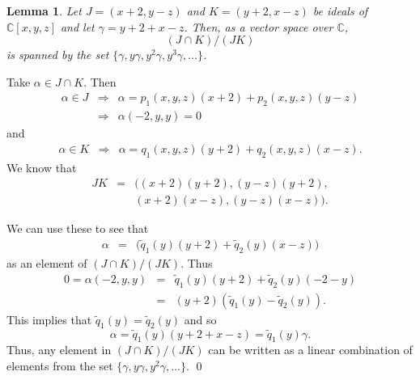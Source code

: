 \documentclass{slides}
\newcommand{\bbc}{\mathbb{C}}
\newtheorem{lemma}{Lemma}
\begin{document}
\begin{slide}
\begin{lemma}
Let $J = (x+2, y-z)$ and $K = (y+2, x-z)$ be ideals of
$\bbc[x,y,z]$ and let $\gamma = y + 2 + x - z$.
Then, as a vector space over $\bbc$,
$$(J \cap K)/(JK)$$ is spanned by the set
$\{ \gamma, y \gamma, y^2 \gamma, y^3 \gamma, \dots \}$.
\label{lem-y-gamma}
\end{lemma}

\proof
Take $\alpha \in J \cap K$.  Then
\begin{eqnarray}
\alpha \in J & \Rightarrow & \alpha = p_1(x,y,z) (x+2) + p_2(x,y,z) (y-z) \nonumber \\
& \Rightarrow & \alpha(-2,y,y) = 0 \nonumber
\end{eqnarray}
and
\begin{eqnarray}
\alpha \in K & \Rightarrow & \alpha = q_1(x,y,z) (y+2) + q_2(x,y,z) (x-z). \nonumber
\end{eqnarray}
We know that
\begin{eqnarray}
JK & = & \Big( (x+2)(y+2), (y-z)(y+2), \nonumber \\
& & (x+2)(x-z), (y-z)(x-z) \Big). \nonumber
\end{eqnarray}
\end{slide}

\begin{slide}
We can use these to see that
\begin{eqnarray}
\alpha &  = & \Big( \tilde{q}_1(y) (y+2) + \tilde{q}_2(y) (x-z) \Big)\nonumber
\end{eqnarray}
as an element of $(J \cap K) / (JK)$.
Thus
\begin{eqnarray}
0 = \alpha(-2,y,y) & = & \tilde{q}_1(y)(y+2) + \tilde{q}_2(y)(-2-y) \nonumber \\
& = & (y+2)(\tilde{q}_1(y) - \tilde{q}_2(y)). \nonumber
\end{eqnarray}
This implies that $\tilde{q}_1(y)  = \tilde{q}_2(y)$ and so
$$\alpha = \tilde{q}_1(y) (y + 2 + x - z) = \tilde{q}_1(y) \gamma.$$
Thus, any element in $(J \cap K) / (JK)$ can be written as a linear
combination of elements from the set $\{ \gamma, y \gamma, y^2 \gamma, \dots \}$.
\qed
\end{slide}
\end{document}

